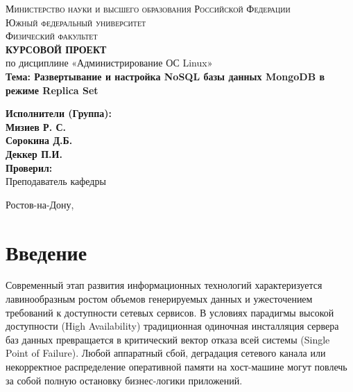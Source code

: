 \documentclass[a4paper,14pt]{extarticle}
\begin{document}
	
	\begin{titlepage}
		\begin{center}
			\textsc{\large Министерство науки и высшего образования Российской Федерации}\\[0.4cm]
			\textsc{\large Южный федеральный университет}\\[0.4cm] %
			\textsc{\large Физический факультет}\\[4.5cm] %
			
			\textbf{\Large КУРСОВОЙ ПРОЕКТ}\\[0.5cm]
			\large по дисциплине «Администрирование ОС Linux»\\[1cm]
			
			\textbf{\Large Тема: Развертывание и настройка NoSQL базы данных MongoDB в режиме Replica Set}\\[3.5cm]
		\end{center}
		
		\begin{flushright}
			\large
			\textbf{Исполнители (Группа):} \\
			\textbf{Мизиев Р. С.} \\ %
			\textbf{Сорокина Д.Б.} \\
			\textbf{Деккер П.И.} \\[0.8cm]
			\textbf{Проверил:} \\
			Преподаватель кафедры \\
		\end{flushright}
		
		\vfill
		\begin{center}
			\large Ростов-на-Дону, \the\year
		\end{center}
	\end{titlepage}
	
	\newpage
	\tableofcontents
	\newpage
	
	\section*{Введение}
	Современный этап развития информационных технологий характеризуется лавинообразным ростом объемов генерируемых данных и ужесточением требований к доступности сетевых сервисов. В условиях парадигмы высокой доступности (High Availability) традиционная одиночная инсталляция сервера баз данных превращается в критический вектор отказа всей системы (Single Point of Failure). Любой аппаратный сбой, деградация сетевого канала или некорректное распределение оперативной памяти на хост-машине могут повлечь за собой полную остановку бизнес-логики приложений.
	
\end{document}
